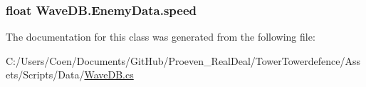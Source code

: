 \subsubsection[{\texorpdfstring{speed}{speed}}]{\setlength{\rightskip}{0pt plus 5cm}float Wave\+D\+B.\+Enemy\+Data.\+speed}\hypertarget{class_wave_d_b_1_1_enemy_data_ae3809cd08031f91212306be073ab6bcf}{}\label{class_wave_d_b_1_1_enemy_data_ae3809cd08031f91212306be073ab6bcf}


The documentation for this class was generated from the following file\+:\begin{DoxyCompactItemize}
\item 
C\+:/\+Users/\+Coen/\+Documents/\+Git\+Hub/\+Proeven\+\_\+\+Real\+Deal/\+Tower\+Towerdefence/\+Assets/\+Scripts/\+Data/\hyperlink{_wave_d_b_8cs}{Wave\+D\+B.\+cs}\end{DoxyCompactItemize}
